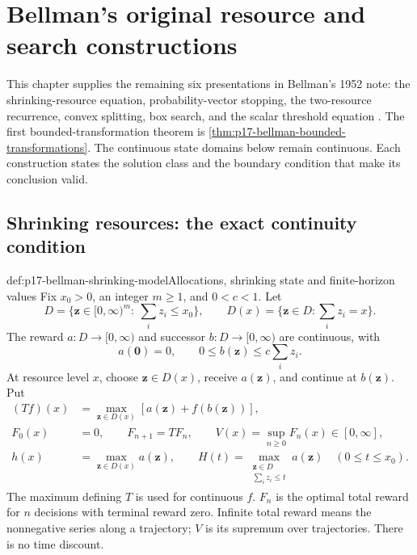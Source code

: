 \chapter{Bellman's original resource and search constructions}
\label{sec:p17-bellman-original-constructions}

This chapter supplies the remaining six presentations in Bellman's
1952 note: the shrinking-resource equation, probability-vector
stopping, the two-resource recurrence, convex splitting, box search,
and the scalar threshold equation
\cite[Theorems~2--7, pp.~717--719]{Bellman1952DynamicProgramming}.
The first bounded-transformation theorem is
\cref{thm:p17-bellman-bounded-transformations}.
The continuous state domains below remain continuous. Each
construction states the solution class and the boundary condition
that make its conclusion valid.

\section{Shrinking resources: the exact continuity condition}

\begin{hbdefinition}{def:p17-bellman-shrinking-model}{Allocations, shrinking state and finite-horizon values}
Fix \(x_0>0\), an integer \(m\geq1\), and \(0<c<1\).
Let
\[
 D=\{\mathbf z\in[0,\infty)^m:\ \textstyle\sum_i z_i\leq x_0\},
 \qquad D(x)=\{\mathbf z\in D:\textstyle\sum_i z_i=x\}.
\]
The reward \(a:D\to[0,\infty)\) and successor
\(b:D\to[0,\infty)\) are continuous, with
\[
                a(\mathbf0)=0,\qquad
                0\leq b(\mathbf z)\leq c\sum_i z_i.
\]
At resource level \(x\), choose \(\mathbf z\in D(x)\),
receive \(a(\mathbf z)\), and continue at \(b(\mathbf z)\).
Put
\[
\begin{aligned}
 (Tf)(x)&=\max_{\mathbf z\in D(x)}
                         [a(\mathbf z)+f(b(\mathbf z))],\\
 F_0(x)&=0,\qquad F_{n+1}=TF_n,\qquad
 V(x)=\sup_{n\geq0}F_n(x)\in[0,\infty],\\
 h(x)&=\max_{\mathbf z\in D(x)}a(\mathbf z),\qquad
 H(t)=\max_{\substack{\mathbf z\in D\\\sum_i z_i\leq t}}a(\mathbf z)
                                           \quad(0\leq t\leq x_0).
\end{aligned}
\]
The maximum defining \(T\) is used for continuous \(f\).
\(F_n\) is the optimal total reward for \(n\) decisions
with terminal reward zero. Infinite total reward means
the nonnegative series along a trajectory; \(V\) is its
supremum over trajectories. There is no time discount.
\end{hbdefinition}

